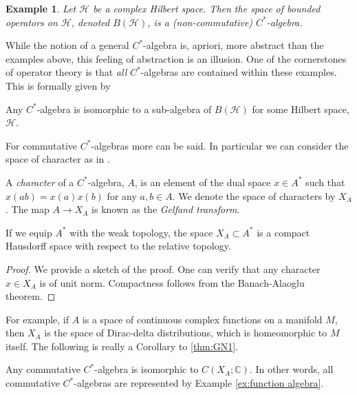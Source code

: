 \documentclass[final,leqno]{siamltex1213}
\newtheorem{example}[theorem]{Example}
\begin{document}
\begin{example}
	Let $\mathcal{H}$ be a complex Hilbert space. Then the space of bounded operators on $\mathcal{H}$, denoted $B(\mathcal{H})$, is a (non-commutative) $C^{*}$-algebra.
\end{example}

While the notion of a general $C^{*}$-algebra is, apriori, more abstract than the examples above, this feeling of abstraction is an illusion.
One of the cornerstones of operator theory is that \emph{all} $C^{*}$-algebras are contained within these examples.
This is formally given by

\begin{theorem} \label{thm:GN1}
	Any $C^{*}$-algebra is isomorphic to a sub-algebra of $B(\mathcal{H})$ for some Hilbert space, $\mathcal{H}$.
\end{theorem}

For commutative $C^{*}$-algebras more can be said.
In particular we can consider the space of character as in \cite{Bondia2001}.

\begin{definition}
	A \emph{character} of a $C^{*}$-algebra, $A$, is an element of the dual space $x \in A^{*}$ such that
	$x(ab) = x(a) x(b)$ for any $a,b \in A$.  We denote the space of characters by $X_{A}$.
	The map $A \to X_{A}$ is known as the \emph{Gelfand transform}.
\end{definition}

\begin{proposition}
	If we equip $A^{*}$ with the weak topology, the space $X_{A} \subset A^{*}$ is a compact Hausdorff space with respect to the relative topology.
\end{proposition}
\begin{proof}
	We provide a sketch of the proof.
	One can verify that any character $x \in X_{A}$ is of unit norm.
	Compactness follows from the Banach-Alaoglu theorem.
\end{proof}

For example, if $A$ is a space of continuous complex functions on a manifold $M$, then $X_{A}$ is the space of Dirac-delta distributions, which is homeomorphic to $M$ itself.
The following is really a Corollary to \ref{thm:GN1}.

\begin{theorem} \label{thm:GN2}
	Any commutative $C^{*}$-algebra is isomorphic to $C(X_{A} ; \mathbb{C})$.
	In other words, all commutative $C^{*}$-algebras are represented by Example \ref{ex:function algebra}.
\end{theorem}
\end{document}
